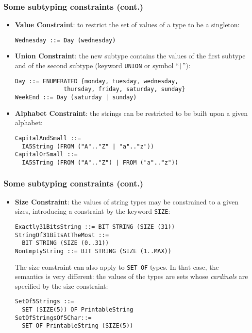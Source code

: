 \documentclass[compress,dvips,xcolor={dvipsnames},t]{beamer}
\begin{document}
\begin{frame}[containsverbatim]
\frametitle{Some subtyping constraints (cont.)}

\begin{itemize}

  \item \textbf{Value Constraint}: to restrict the set of values of a
  type to be a singleton:

\begin{verbatim}
Wednesday ::= Day (wednesday)
\end{verbatim}

  \item \textbf{Union Constraint}: the new subtype contains the values
  of the first subtype and of the second subtype (keyword
  \texttt{UNION} or symbol ``\texttt{|}''):

\begin{verbatim}
Day ::= ENUMERATED {monday, tuesday, wednesday,
              thursday, friday, saturday, sunday}
WeekEnd ::= Day (saturday | sunday)
\end{verbatim}

  \item \textbf{Alphabet Constraint}: the strings can be restricted to
  be built upon a given alphabet:

\begin{verbatim}
CapitalAndSmall ::=
  IA5String (FROM ("A".."Z" | "a".."z"))
CapitalOrSmall ::= 
  IA5STring (FROM ("A".."Z") | FROM ("a".."z"))
\end{verbatim}

\end{itemize}

\end{frame}

\begin{frame}[containsverbatim]
\frametitle{Some subtyping constraints (cont.)}

\begin{itemize}

  \item \textbf{Size Constraint}: the values of string types may be
        constrained to a given sizes, introducing a constraint by the
        keyword \texttt{SIZE}:

\begin{verbatim}
Exactly31BitsString ::= BIT STRING (SIZE (31))
StringOf31BitsAtTheMost ::=
  BIT STRING (SIZE (0..31))
NonEmptyString ::= BIT STRING (SIZE (1..MAX))
\end{verbatim}

The size constraint can also apply to \texttt{SET OF} types. In that
case, the semantics is very different: the values of the types are
sets whose \emph{cardinals} are specified by the size constraint:

\begin{verbatim}
SetOf5Strings ::=
  SET (SIZE(5)) OF PrintableString
SetOfStringsOf5Char::=
  SET OF PrintableString (SIZE(5))
\end{verbatim}

\end{itemize}

\end{frame}
\end{document}
